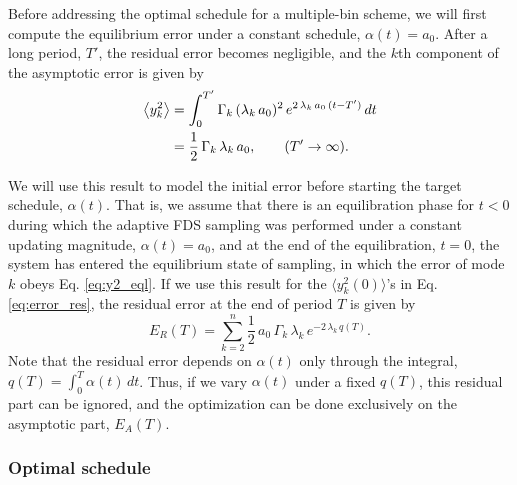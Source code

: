 \documentclass[reprint, superscriptaddress, floatfix]{revtex4-1}
\newcommand{\Err}{E}
\begin{document}
Before addressing the optimal schedule
for a multiple-bin scheme,
we will first compute the equilibrium error
under a constant schedule,
$\alpha(t) = a_0$.
%
After a long period, $T'$,
the residual error becomes negligible, and
the $k$th component of the asymptotic error
is given by
%
%
%
\begin{align}
  \left\langle
    y_k^2
  \right\rangle
  &=
  \int_0^{T'}
    \Gamma_k \, (\lambda_k \, a_0)^2 \,
      e^{ 2 \, \lambda_k \, a_0 \, (t - T') }
    \, dt
  \notag
  \\
  &=
  \frac 1 2 \, \Gamma_k \, \lambda_k \, a_0
  ,
  \qquad
  ( T' \to \infty )
  .
\label{eq:y2_eql}
\end{align}
%


We will use this result to model the initial error
before starting the target schedule, $\alpha(t)$.
%
That is, we assume that there is an equilibration phase
for $t < 0$ during which the adaptive FDS sampling was performed
under a constant updating magnitude,
$\alpha(t) = a_0$, and at the end of the equilibration, $t = 0$,
the system has entered the equilibrium state of sampling,
in which the error of mode $k$ obeys Eq. \eqref{eq:y2_eql}.
%
If we use this result
for the $\langle y_k^2(0) \rangle$'s
in Eq. \eqref{eq:error_res},
the residual error at the end of period $T$
is given by
%
\begin{equation}
  \Err_R(T)
  =
  \sum_{k = 2}^n
      \frac 1 2 \, a_0 \, \Gamma_k \, \lambda_k \,
      e^{  - 2 \, \lambda_k \, q(T) }
  .
  \label{eq:error_res1}
\end{equation}
%
Note that the residual error
depends on $\alpha(t)$ only through
the integral, $q(T) = \int_0^T \alpha(t) \, dt$.
%
Thus, if we vary $\alpha(t)$ under a fixed $q(T)$,
this residual part can be ignored,
and the optimization can be done exclusively
on the asymptotic part, $\Err_A(T)$.



\subsubsection{\label{sec:optschedule}
Optimal schedule}
\end{document}
